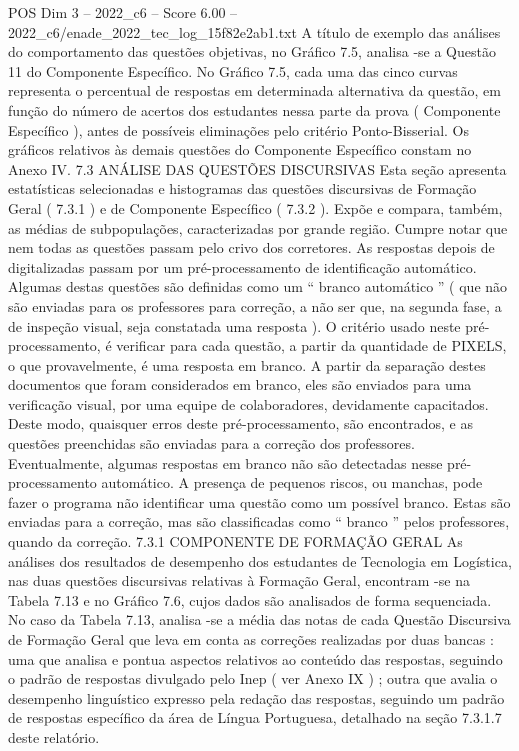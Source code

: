 \begin{textsample}{POS Dim 3 – 2022\_c6 – Score 6.00 – 2022\_c6/enade\_2022\_tec\_log\_15f82e2ab1.txt}
A título de exemplo das análises do comportamento das questões objetivas, no Gráfico 7.5, analisa -se a Questão 11 do Componente Específico.
No Gráfico 7.5, cada uma das cinco curvas representa o percentual de respostas em determinada alternativa da questão, em função do número de acertos dos estudantes nessa parte da prova ( Componente Específico ), antes de possíveis eliminações pelo critério Ponto-Bisserial.
Os gráficos relativos às demais questões do Componente Específico constam no Anexo IV. 7.3 ANÁLISE DAS QUESTÕES DISCURSIVAS Esta seção apresenta estatísticas selecionadas e histogramas das questões discursivas de Formação Geral ( 7.3.1 ) e de Componente Específico ( 7.3.2 ).
Expõe e compara, também, as médias de subpopulações, caracterizadas por grande região.
Cumpre notar que nem todas as questões passam pelo crivo dos corretores.
As respostas depois de digitalizadas passam por um pré-processamento de identificação automático.
Algumas destas questões são definidas como um “ branco automático ” ( que não são enviadas para os professores para correção, a não ser que, na segunda fase, a de inspeção visual, seja constatada uma resposta ).
O critério usado neste pré-processamento, é verificar para cada questão, a partir da quantidade de PIXELS, o que provavelmente, é uma resposta em branco.
A partir da separação destes documentos que foram considerados em branco, eles são enviados para uma verificação visual, por uma equipe de colaboradores, devidamente capacitados.
Deste modo, quaisquer erros deste pré-processamento, são encontrados, e as questões preenchidas são enviadas para a correção dos professores.
Eventualmente, algumas respostas em branco não são detectadas nesse pré-processamento automático.
A presença de pequenos riscos, ou manchas, pode fazer o programa não identificar uma questão como um possível branco.
Estas são enviadas para a correção, mas são classificadas como “ branco ” pelos professores, quando da correção. 7.3.1 COMPONENTE DE FORMAÇÃO GERAL As análises dos resultados de desempenho dos estudantes de Tecnologia em Logística, nas duas questões discursivas relativas à Formação Geral, encontram -se na Tabela 7.13 e no Gráfico 7.6, cujos dados são analisados de forma sequenciada.
No caso da Tabela 7.13, analisa -se a média das notas de cada Questão Discursiva de Formação Geral que leva em conta as correções realizadas por duas bancas : uma que analisa e pontua aspectos relativos ao conteúdo das respostas, seguindo o padrão de respostas divulgado pelo Inep ( ver Anexo IX ) ; outra que avalia o desempenho linguístico expresso pela redação das respostas, seguindo um padrão de respostas específico da área de Língua Portuguesa, detalhado na seção 7.3.1.7 deste relatório.

\end{textsample}

